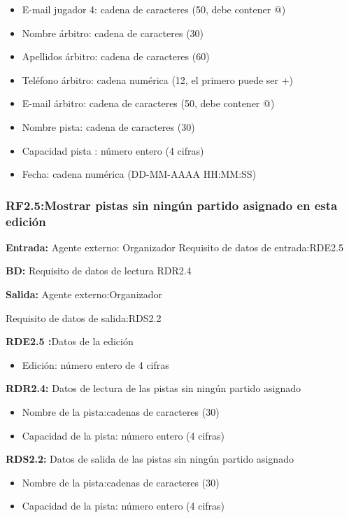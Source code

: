 \begin{itemize}
	\item E-mail jugador 4: cadena de caracteres (50, debe contener @)
\newline
	\item Nombre árbitro: cadena de caracteres (30)
	\item Apellidos árbitro: cadena de caracteres (60)
	\item Teléfono árbitro: cadena numérica (12, el primero puede ser +)
	\item E-mail árbitro: cadena de caracteres (50, debe contener @)
\newline
	\item Nombre pista: cadena de caracteres (30)
	\item Capacidad pista : número entero (4 cifras)
	\item Fecha: cadena numérica (DD-MM-AAAA HH:MM:SS)
\end{itemize}

\subsubsection{RF2.5:Mostrar pistas sin ningún partido asignado en esta edición}
\textbf{Entrada:} Agente externo: Organizador        Requisito de datos de entrada:RDE2.5

\textbf{BD:} Requisito de datos de  lectura RDR2.4

\textbf{Salida:} Agente externo:Organizador

Requisito de datos de salida:RDS2.2

\textbf{RDE2.5 :}Datos de la edición
\begin{itemize}
	\item Edición: número entero de 4 cifras
\end{itemize}

\textbf{RDR2.4:} Datos de lectura de las pistas sin ningún partido asignado
\begin{itemize}
	\item Nombre de la pista:cadenas de caracteres (30)
	\item Capacidad de la pista: número  entero  (4 cifras)
\end{itemize}

\textbf{RDS2.2:} Datos de salida de las pistas sin ningún partido asignado
\begin{itemize}
	\item Nombre de la pista:cadenas de caracteres (30)
	\item Capacidad de la pista: número  entero  (4 cifras)
\end{itemize}

